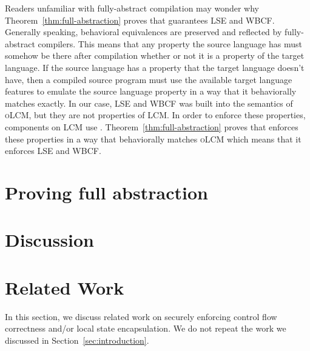 \documentclass[acmsmall,screen]{acmart}\settopmatter{}
\newcommand{\trgcm}{\textsc{LCM}}
\newcommand{\srccm}{\textsc{oLCM}}
\begin{document}
Readers unfamiliar with fully-abstract compilation may wonder why Theorem~\ref{thm:full-abstraction} proves that \stktokens{} guarantees LSE and WBCF.
Generally speaking, behavioral equivalences are preserved and reflected by fully-abstract compilers.
This means that any property the source language has must somehow be there after compilation whether or not it is a property of the target language.
If the source language has a property that the target language doesn't have, then a compiled source program must use the available target language features to emulate the source language property in a way that it behaviorally matches exactly.
In our case, LSE and WBCF was built into the semantics of \srccm{}, but they are not properties of \trgcm{}.
In order to enforce these properties, components on \trgcm{} use \stktokens{}.
Theorem~\ref{thm:full-abstraction} proves that \stktokens{} enforces these properties in a way that behaviorally matches \srccm{} which means that it enforces LSE and WBCF.




\section{Proving full abstraction}
\label{sec:fa-proof}


\section{Discussion}
\label{sec:discussion}


\section{Related Work}
In this section, we discuss related work on securely enforcing control flow correctness and/or local state encapsulation.
We do not repeat the work we discussed in Section~\ref{sec:introduction}.
\end{document}
